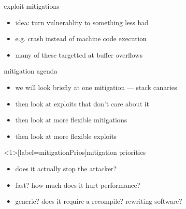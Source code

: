\usetikzlibrary{positioning,shapes.callouts}
\begin{frame}{exploit mitigations}
    \begin{itemize}
    \item idea: turn vulnerablity to something less bad
    \item e.g. crash instead of machine code execution
    \vspace{.5cm}
    \item many of these targetted at buffer overflows
    \end{itemize}
\end{frame}

\begin{frame}{mitigation agenda}
    \begin{itemize}
        \item we will look briefly at one mitigation --- stack canaries
        \item then look at exploits that don't care about it
        \item then look at more flexible mitigations
        \item then look at more flexible exploits
    \end{itemize}
\end{frame}

\begin{frame}<1>[label=mitigationPrios]{mitigation priorities}
    \begin{itemize}
    \item {} does it actually stop the attacker?
    \item fast? how much does it hurt performance?
    \item generic? does it require a recompile? rewriting software?
    \end{itemize}

\end{frame}
